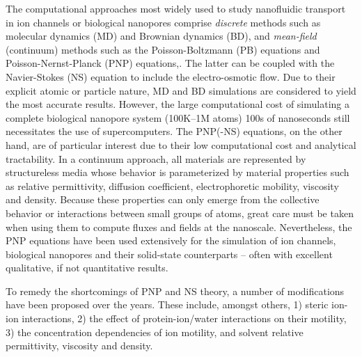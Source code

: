 \documentclass[journal=ancac3,manuscript=article,etalmode=truncate,maxauthors=0,layout=twocolumn]{achemso}
\begin{document}
The computational approaches most widely used to study nanofluidic transport in ion channels or biological
nanopores comprise \emph{discrete} methods such as molecular dynamics (MD)\cite{Lynden-Bell-1996,
Allen-1999,Aksimentiev-2005,Luan-2008,Bhattacharya-2011,Zhang-2014,DiMarino-2015,Belkin-2016} and Brownian
dynamics (BD),\cite{Schirmer-1999,Im-2002,Noskov-2004,Millar-2008,Egwolf-2010,DeBiase-2015,Pederson-2015}
and \emph{mean-field} (continuum) methods such as the Poisson-Boltzmann (PB) equations\cite{Grochowski-2008,
Baldessari-2008-1} and Poisson-Nernst-Planck (PNP) equations,\cite{Eisenberg-1996,Gillespie-2002,
Simakov-2010}. The latter can be coupled with the Navier-Stokes (NS) equation to include the electro-osmotic
flow.\cite{Lu-2012,Pederson-2015} Due to their explicit atomic or particle nature, MD and BD simulations are
considered to yield the most accurate results. However, the large computational cost of simulating a complete
biological nanopore system (100K--1M atoms) 100s of nanoseconds still necessitates the use of
supercomputers.\cite{Aksimentiev-2005,Bhattacharya-2011} The PNP(-NS) equations, on the other hand, are of
particular interest due to their low computational cost and  analytical tractability. In a continuum approach,
all materials are represented by structureless media whose behavior is parameterized by material properties
such as relative permittivity, diffusion coefficient, electrophoretic mobility, viscosity and density. Because
these properties can only emerge from the collective behavior or interactions between small groups of atoms,
great care must be taken when using them to compute fluxes and fields at the
nanoscale.\cite{Corry-2000,Collins-2012} Nevertheless, the PNP equations have been used extensively for the
simulation of ion channels,\cite{Im-2002,Furini-2006,Liu-2015} biological
nanopores\cite{Simakov-2010,Pederson-2015,Aguilella-Arzo-2017,Simakov-2018} and their solid-state
counterparts\cite{Cervera-2005,White-2008,Chaudhry-2014,Laohakunakorn-2015} -- often with excellent
qualitative, if not quantitative results.\cite{Maffeo-2012,Thomas-2014,Kim-2015}

To remedy the shortcomings of PNP and NS theory, a number of modifications have been proposed over the years.
These include, amongst others, 1) steric ion-ion interactions, 2) the effect of protein-ion/water interactions
on their motility, 3) the concentration dependencies of ion motility, and solvent relative permittivity,
viscosity and density.
\end{document}
